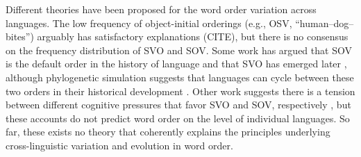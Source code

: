\documentclass[9pt,twocolumn,twoside,lineno]{pnas-new}
\begin{document}
Different theories have been proposed for the word order variation across languages. The low frequency of object-initial orderings (e.g., OSV, ``human--dog--bites'') arguably has satisfactory explanations {\color{blue}(CITE)}, but there is no consensus on the frequency distribution of SVO and SOV. Some work has argued that SOV is the default order in the history of language and that SVO has emerged later \citep{givon1979understanding,senghas1997argument, newmeyer2000evolutionary, goldin-meadow2008natural, gibson-noisy-channel-2013}, although phylogenetic simulation suggests that languages can cycle between these two orders in their historical development \citep{maurits2014tracing}. Other work suggests there is a tension between different cognitive pressures that favor SVO and SOV, respectively \citep{langus2010cognitive, ferrer-i-cancho-placement-2017}, but these accounts do not predict word order on the level of individual languages. So far, these exists no theory that coherently explains the principles underlying cross-linguistic variation and evolution in word order.
\end{document}
